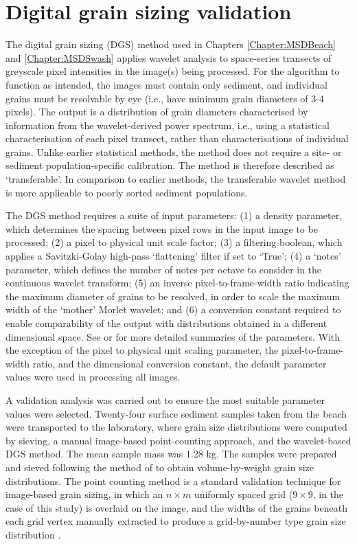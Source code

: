 \chapter{\label{a:A2}Digital grain sizing validation}

The \citet{Buscombe2013} digital grain sizing (DGS) method used in Chapters \ref{Chapter:MSDBeach} and \ref{Chapter:MSDSwash} applies wavelet analysis to space-series transects of greyscale pixel intensities in the image(s) being processed. For the algorithm to function as intended, the images must contain only sediment, and individual grains must be resolvable by eye (i.e., have minimum grain diameters of 3-4 pixels). The output is a distribution of grain diameters characterised by information from the wavelet-derived power spectrum, i.e., using a statistical characterisation of each pixel transect, rather than characterisations of individual grains. Unlike earlier statistical methods, the \citet{Buscombe2013} method does not require a site- or sediment population-specific calibration. The method is therefore described as `transferable'. In comparison to earlier methods, the transferable wavelet method is more applicable to poorly sorted sediment populations.

The DGS method requires a suite of input parameters: (1) a density parameter, which determines the spacing between pixel rows in the input image to be processed; (2) a pixel to physical unit scale factor; (3) a filtering boolean, which applies a Savitzki-Golay high-pass `flattening' filter if set to `True'; (4) a `notes' parameter, which defines the number of notes per octave to consider in the continuous wavelet transform; (5) an inverse pixel-to-frame-width ratio indicating the maximum diameter of grains to be resolved, in order to scale the maximum width of the `mother' Morlet wavelet; and (6) a conversion constant required to enable comparability of the output with distributions obtained in a different dimensional space. See \citet{Buscombe2013} or \citet{Cuttler_etal2017} for more detailed summaries of the parameters. With the exception of the pixel to physical unit scaling parameter, the pixel-to-frame-width ratio, and the dimensional conversion constant, the default parameter values were used in processing all images.

A validation analysis was carried out to ensure the most suitable parameter values were selected. Twenty-four surface sediment samples taken from the beach were transported to the laboratory, where grain size distributions were computed by sieving, a manual image-based point-counting approach, and the wavelet-based DGS method. The mean sample mass was 1.28 kg. The samples were prepared and sieved following the method of \citet{Ingram1971} to obtain volume-by-weight grain size distributions. The point counting method is a standard validation technique for image-based grain sizing, in which an $n\times m$ uniformly spaced grid ($9\times 9$, in the case of this study) is overlaid on the image, and the widths of the grains beneath each grid vertex manually extracted to produce a grid-by-number type grain size distribution \citep[e.g.,][]{Barnard_etal2007, Buscombe_etal2010}. 

